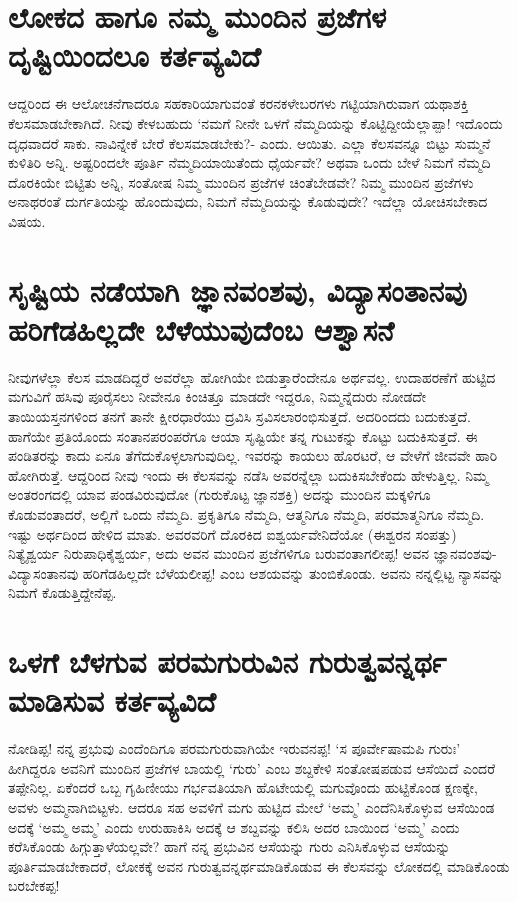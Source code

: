 \section*{ಲೋಕದ ಹಾಗೂ ನಮ್ಮ ಮುಂದಿನ ಪ್ರಜೆಗಳ ದೃಷ್ಟಿಯಿಂದಲೂ ಕರ್ತವ್ಯವಿದೆ}

ಆದ್ದರಿಂದ ಈ ಆಲೋಚನೆಗಾದರೂ ಸಹಕಾರಿಯಾಗುವಂತೆ ಕರನಕಳೇಬರಗಳು ಗಟ್ಟಿಯಾಗಿರುವಾಗ ಯಥಾಶಕ್ತಿ ಕೆಲಸಮಾಡಬೇಕಾಗಿದೆ. ನೀವು ಕೇಳಬಹುದು `ನಮಗೆ ನೀನೇ ಒಳಗೆ ನೆಮ್ಮದಿಯನ್ನು ಕೊಟ್ಟಿದ್ದೀಯೆಲ್ಲಾಪ್ಪಾ! ಇದೊಂದು ದೃಧವಾದರೆ ಸಾಕು. ನಾವಿನ್ನೇಕೆ ಬೇರೆ ಕೆಲಸಮಾಡಬೇಕು?- ಎಂದು. ಆಯಿತು. ಎಲ್ಲಾ ಕೆಲಸವನ್ನೂ ಬಿಟ್ಟು ಸುಮ್ಮನೆ ಕುಳಿತಿರಿ ಅನ್ನಿ. ಅಷ್ಟರಿಂದಲೇ ಪೂರ್ತಿ ನೆಮ್ಮದಿಯಾಯಿತೆಂದು ಧೈರ್ಯವೇ? ಅಥವಾ ಒಂದು ಬೇಳೆ ನಿಮಗೆ ನೆಮ್ಮದಿ ದೊರಕಿಯೇ ಬಿಟ್ಟಿತು ಅನ್ನಿ, ಸಂತೋಷ ನಿಮ್ಮ ಮುಂದಿನ ಪ್ರಜೆಗಳ ಚಿಂತೆಬೇಡವೇ? ನಿಮ್ಮ ಮುಂದಿನ ಪ್ರಜೆಗಳು ಅನಾಥರಂತೆ ದುರ್ಗತಿಯನ್ನು ಹೊಂದುವುದು, ನಿಮಗೆ ನೆಮ್ಮದಿಯನ್ನು ಕೊಡುವುದೇ? ಇದೆಲ್ಲಾ ಯೋಚಿಸಬೇಕಾದ ವಿಷಯ.

\section*{ಸೃಷ್ಟಿಯ ನಡೆಯಾಗಿ ಜ್ಞಾನವಂಶವು, ವಿದ್ಯಾಸಂತಾನವು ಹರಿಗೆಡಹಿಲ್ಲದೇ ಬೆಳೆಯುವುದೆಂಬ ಆಶ್ವಾಸನೆ}

ನೀವುಗಳೆಲ್ಲಾ ಕೆಲಸ ಮಾಡದಿದ್ದರೆ ಅವರೆಲ್ಲಾ ಹೋಗಿಯೇ ಬಿಡುತ್ತಾರೆಂದೇನೂ ಅರ್ಥವಲ್ಲ. ಉದಾಹರಣೆಗೆ ಹುಟ್ಟಿದ ಮಗುವಿಗೆ ಹಸಿವು ಪೂರೈಸಲು ನೀವೇನೂ ಕಿಂಚಿತ್ತೂ ಮಾಡದೇ ಇದ್ದರೂ, ನಿಮ್ಮನ್ನೆದುರು ನೋಡದೇ ತಾಯಿಯಸ್ತನಗಳಿಂದ ತನಗೆ ತಾನೇ ಕ್ಷೀರಧಾರೆಯು ದ್ರವಿಸಿ ಸ್ರವಿಸಲಾರಂಭಿಸುತ್ತದೆ. ಅದರಿಂದದು ಬದುಕುತ್ತದೆ. ಹಾಗೆಯೇ ಪ್ರತಿಯೊಂದು ಸಂತಾನಪರಂಪರೆಗೂ ಆಯಾ ಸೃಷ್ಟಿಯೇ ತನ್ನ ಗುಟುಕನ್ನು ಕೊಟ್ಟು ಬದುಕಿಸುತ್ತದೆ. ಈ ಪಂಡಿತರನ್ನು ಕಾದು ಏನೂ ತೆಗೆದುಕೊಳ್ಳಲಾಗುವುದಿಲ್ಲ. ಇವರನ್ನು ಕಾಯಲು ಹೊರಟರೆ, ಆ ವೇಳೆಗೆ ಜೀವವೇ ಹಾರಿ ಹೋಗಿರುತ್ತೆ. ಆದ್ದರಿಂದ ನೀವು ಇಂದು ಈ ಕೆಲಸವನ್ನು ನಡೆಸಿ ಅವರನ್ನೆಲ್ಲಾ ಬದುಕಿಸಬೇಕೆಂದು ಹೇಳುತ್ತಿಲ್ಲ. ನಿಮ್ಮ ಅಂತರಂಗದಲ್ಲಿ ಯಾವ ಪಂಡವಿರುವುದೋ (ಗುರುಕೊಟ್ಟ ಜ್ಞಾನಶಕ್ತಿ) ಅದನ್ನು ಮುಂದಿನ ಮಕ್ಕಳಿಗೂ ಕೊಡುವಂತಾದರೆ, ಅಲ್ಲಿಗೆ ಒಂದು ನೆಮ್ಮದಿ. ಪ್ರಕೃತಿಗೂ ನೆಮ್ಮದಿ, ಆತ್ಮನಿಗೂ ನೆಮ್ಮದಿ, ಪರಮಾತ್ಮನಿಗೂ ನೆಮ್ಮದಿ. ಇಷ್ಟು ಅರ್ಥದಿಂದ ಹೇಳಿದ ಮಾತು. ಅವರವರಿಗೆ ದೊರಕಿದ ಐಶ್ವರ್ಯವೇನಿದೆಯೋ (ಈಶ್ವರನ ಸಂಪತ್ತು) ನಿತ್ಯೈಶ್ವರ್ಯ ನಿರುಪಾಧಿಕೈಶ್ವರ್ಯ, ಅದು ಅವನ ಮುಂದಿನ ಪ್ರಜೆಗಳಿಗೂ ಬರುವಂತಾಗಲೀಪ್ಪ! ಅವನ ಜ್ಞಾನವಂಶವು- ವಿದ್ಯಾಸಂತಾನವು ಹರಿಗೆಡಹಿಲ್ಲದೇ ಬೆಳೆಯಲೀಪ್ಪ! ಎಂಬ ಆಶಯವನ್ನು ತುಂಬಿಕೊಂಡು. ಅವನು ನನ್ನಲ್ಲಿಟ್ಟ ನ್ಯಾಸವನ್ನು ನಿಮಗೆ ಕೊಡುತ್ತಿದ್ದೇನೆಪ್ಪ.

\section*{ಒಳಗೆ ಬೆಳಗುವ ಪರಮಗುರುವಿನ ಗುರುತ್ವವನ್ನರ್ಥ ಮಾಡಿಸುವ ಕರ್ತವ್ಯವಿದೆ}

ನೋಡಿಪ್ಪ! ನನ್ನ ಪ್ರಭುವು ಎಂದೆಂದಿಗೂ ಪರಮಗುರುವಾಗಿಯೇ ಇರುವನಪ್ಪ! `ಸ ಪೂರ್ವೇಷಾಮಪಿ\label{129} ಗುರುಃ' ಹೀಗಿದ್ದರೂ ಅವನಿಗೆ ಮುಂದಿನ ಪ್ರಜೆಗಳ ಬಾಯಲ್ಲಿ `ಗುರು' ಎಂಬ ಶಬ್ದಕೇಳಿ ಸಂತೋಷಪಡುವ ಆಸೆಯಿದೆ ಎಂದರೆ ತಪ್ಪೇನಿಲ್ಲ. ಏಕೆಂದರೆ ಒಬ್ಬ ಗೃಹಿಣೀಯು ಗರ್ಭವತಿಯಾಗಿ ಹೊಟೇಯಲ್ಲಿ ಮಗುವೊಂದು ಹುಟ್ಟಿಕೊಂಡ ಕ್ಷಣಕ್ಕೇ, ಅವಳು ಅಮ್ಮನಾಗಿಬಿಟ್ಟಳು. ಆದರೂ ಸಹ ಅವಳಿಗೆ ಮಗು ಹುಟ್ಟಿದ ಮೇಲೆ `ಅಮ್ಮ' ಎಂದೆನಿಸಿಕೊಳ್ಳುವ ಆಸೆಯಿಂಡ ಅದಕ್ಕೆ `ಅಮ್ಮ ಅಮ್ಮ' ಎಂದು ಉರುಹಾಕಿಸಿ ಅದಕ್ಕೆ ಆ ಶಬ್ದವನ್ನು ಕಲಿಸಿ ಅದರ ಬಾಯಿಂದ `ಅಮ್ಮ' ಎಂದು ಕರೆಸಿಕೊಂಡು ಹಿಗ್ಗುತ್ತಾಳೆಯಲ್ಲವೇ? ಹಾಗೆ ನನ್ನ ಪ್ರಭುವಿನ ಆಸೆಯನ್ನು ಗುರು ಎನಿಸಿಕೊಳ್ಳುವ ಆಸೆಯನ್ನು ಪೂರ್ತಿಮಾಡಬೇಕಾದರೆ, ಲೋಕಕ್ಕೆ ಅವನ ಗುರುತ್ವವನ್ನರ್ಥಮಾಡಿಕೊಡುವ ಈ ಕೆಲಸವನ್ನು ಲೋಕದಲ್ಲಿ ಮಾಡಿಕೊಂಡು ಬರಬೇಕಪ್ಪ!

